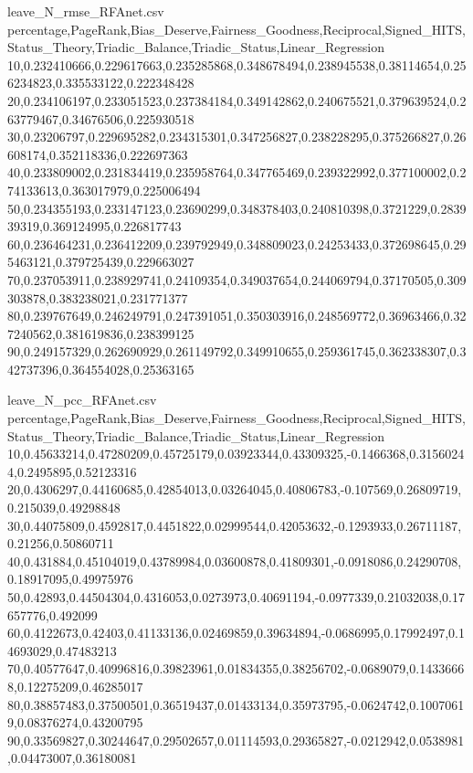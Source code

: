 \begin{filecontents*}{leave_N_rmse_RFAnet.csv}
percentage,PageRank,Bias_Deserve,Fairness_Goodness,Reciprocal,Signed_HITS,Status_Theory,Triadic_Balance,Triadic_Status,Linear_Regression
10,0.232410666,0.229617663,0.235285868,0.348678494,0.238945538,0.38114654,0.256234823,0.335533122,0.222348428
20,0.234106197,0.233051523,0.237384184,0.349142862,0.240675521,0.379639524,0.263779467,0.34676506,0.225930518
30,0.23206797,0.229695282,0.234315301,0.347256827,0.238228295,0.375266827,0.26608174,0.352118336,0.222697363
40,0.233809002,0.231834419,0.235958764,0.347765469,0.239322992,0.377100002,0.274133613,0.363017979,0.225006494
50,0.234355193,0.233147123,0.23690299,0.348378403,0.240810398,0.3721229,0.283939319,0.369124995,0.226817743
60,0.236464231,0.236412209,0.239792949,0.348809023,0.24253433,0.372698645,0.295463121,0.379725439,0.229663027
70,0.237053911,0.238929741,0.24109354,0.349037654,0.244069794,0.37170505,0.309303878,0.383238021,0.231771377
80,0.239767649,0.246249791,0.247391051,0.350303916,0.248569772,0.36963466,0.327240562,0.381619836,0.238399125
90,0.249157329,0.262690929,0.261149792,0.349910655,0.259361745,0.362338307,0.342737396,0.364554028,0.25363165
\end{filecontents*}

\begin{filecontents*}{leave_N_pcc_RFAnet.csv}
percentage,PageRank,Bias_Deserve,Fairness_Goodness,Reciprocal,Signed_HITS,Status_Theory,Triadic_Balance,Triadic_Status,Linear_Regression
10,0.45633214,0.47280209,0.45725179,0.03923344,0.43309325,-0.1466368,0.31560244,0.2495895,0.52123316
20,0.4306297,0.44160685,0.42854013,0.03264045,0.40806783,-0.107569,0.26809719,0.215039,0.49298848
30,0.44075809,0.4592817,0.4451822,0.02999544,0.42053632,-0.1293933,0.26711187,0.21256,0.50860711
40,0.431884,0.45104019,0.43789984,0.03600878,0.41809301,-0.0918086,0.24290708,0.18917095,0.49975976
50,0.42893,0.44504304,0.4316053,0.0273973,0.40691194,-0.0977339,0.21032038,0.17657776,0.492099
60,0.4122673,0.42403,0.41133136,0.02469859,0.39634894,-0.0686995,0.17992497,0.14693029,0.47483213
70,0.40577647,0.40996816,0.39823961,0.01834355,0.38256702,-0.0689079,0.14336668,0.12275209,0.46285017
80,0.38857483,0.37500501,0.36519437,0.01433134,0.35973795,-0.0624742,0.10070619,0.08376274,0.43200795
90,0.33569827,0.30244647,0.29502657,0.01114593,0.29365827,-0.0212942,0.0538981,0.04473007,0.36180081
\end{filecontents*}

